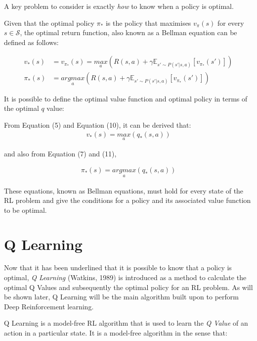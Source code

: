 \documentclass{article}
\begin{document}
A key problem to consider is exactly \textit{how} to know when a policy is optimal.

Given that the optimal policy $\pi_*$ is the policy that maximises $v_\pi(s)$ for every $s \in \mathcal{S}$, the optimal return function, also known as a Bellman equation can be defined as follows\cite{Sutton1998}:

\begin{align}
    v_*(s) &= v_{\pi_*}(s) = \underset{a}{max}(R(s, a) + \gamma \mathbb{E}_{s' \sim P(s'|s, a)} \left[ v_{\pi_*}(s')\right]) \\
    \pi_*(s) &= \underset{a}{argmax}(R(s, a) + \gamma \mathbb{E}_{s' \sim P(s'|s, a)} \left[ v_{\pi_*}(s')\right]) 
\end{align}



It is possible to define the optimal value function and optimal policy in terms of the optimal $q$ value:

From Equation (5) and Equation (10), it can be derived that:
\begin{align}
    v_* (s) = \underset{a}{max} (q_*(s, a))
\end{align}


and also from Equation (7) and (11),

\begin{align}
    \pi_*(s) = \underset{a}{argmax}(q_*(s,a))
\end{align}

These equations, known as Bellman equations, must hold for every state of the RL problem and give the conditions for a policy and its associated value function to be optimal. 

\newpage

\section{Q Learning}

Now that it has been underlined that it is possible to know that a policy is optimal, \textit{Q Learning} (Watkins, 1989) is introduced as a method to calculate the optimal Q Values and subsequently the optimal policy for an RL problem\cite{Watkins:89}. As will be shown later, Q Learning will be the main algorithm built upon to perform Deep Reinforcement learning. 

Q Learning is a model-free RL algorithm that is used to learn the \textit{Q Value} of an action in a particular state. It is a model-free algorithm in the sense that:
\end{document}
